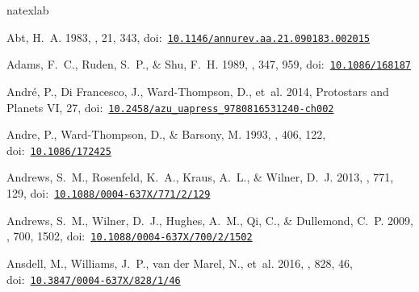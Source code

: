 \documentclass[twocolumn, 12pt]{aastex63}
\begin{document}
\clearpage
\begin{small}

\begin{thebibliography}{}
\expandafter\ifx\csname natexlab\endcsname\relax\def\natexlab#1{#1}\fi
\providecommand{\url}[1]{\href{#1}{#1}}
\providecommand{\dodoi}[1]{doi:~\href{http://doi.org/#1}{\nolinkurl{#1}}}
\providecommand{\doeprint}[1]{\href{http://ascl.net/#1}{\nolinkurl{http://ascl.net/#1}}}
\providecommand{\doarXiv}[1]{\href{https://arxiv.org/abs/#1}{\nolinkurl{https://arxiv.org/abs/#1}}}

{Abt}, H.~A. 1983, \araa, 21, 343, \dodoi{10.1146/annurev.aa.21.090183.002015}

{Adams}, F.~C., {Ruden}, S.~P., \& {Shu}, F.~H. 1989, \apj, 347, 959,
  \dodoi{10.1086/168187}

{Andr{\'e}}, P., {Di Francesco}, J., {Ward-Thompson}, D., {et~al.} 2014,
  Protostars and Planets VI, 27,
  \dodoi{10.2458/azu_uapress_9780816531240-ch002}

{Andre}, P., {Ward-Thompson}, D., \& {Barsony}, M. 1993, \apj, 406, 122,
  \dodoi{10.1086/172425}

{Andrews}, S.~M., {Rosenfeld}, K.~A., {Kraus}, A.~L., \& {Wilner}, D.~J. 2013,
  \apj, 771, 129, \dodoi{10.1088/0004-637X/771/2/129}

{Andrews}, S.~M., {Wilner}, D.~J., {Hughes}, A.~M., {Qi}, C., \& {Dullemond},
  C.~P. 2009, \apj, 700, 1502, \dodoi{10.1088/0004-637X/700/2/1502}

{Ansdell}, M., {Williams}, J.~P., {van der Marel}, N., {et~al.} 2016, \apj,
  828, 46, \dodoi{10.3847/0004-637X/828/1/46}


\end{thebibliography}
\end{small}
\end{document}

